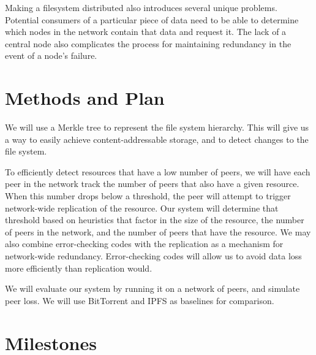 \documentclass[twocolumn]{article}
\begin{document}
Making a filesystem distributed also introduces several unique problems.
Potential consumers of a particular piece of data need to be able to determine which nodes in the network contain that data and request it.
The lack of a central node also complicates the process for maintaining redundancy in the event of a node's failure.

\section{Methods and Plan}


We will use a Merkle tree to represent the file system hierarchy.
This will give us a way to easily achieve content-addressable storage, and to detect changes to the file system.

To efficiently detect resources that have a low number of peers, we will have each peer in the network track the number of peers that also have a given resource.
When this number drops below a threshold, the peer will attempt to trigger network-wide replication of the resource.
Our system will determine that threshold based on heuristics that factor in the size of the resource, the number of peers in the network, and the number of peers that have the resource.
We may also combine error-checking codes with the replication as a mechanism for network-wide redundancy.
Error-checking codes will allow us to avoid data loss more efficiently than replication would.

We will evaluate our system by running it on a network of peers, and simulate peer loss.
We will use BitTorrent and IPFS as baselines for comparison.

\section{Milestones}


\lipsum[4]
\end{document}

